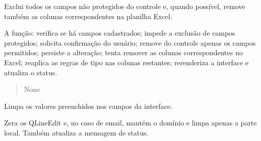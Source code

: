 \documentclass[letterpaper,10pt,english]{sphinxmanual}
\begin{document}
\begin{fulllineitems}
\begin{fulllineitems}
\begin{quote}
\begin{description}
\end{description}\end{quote}

\end{fulllineitems}


\begin{fulllineitems}
\label{\detokenize{api/app:app.App.delete_all_fields}}
\pysigstartsignatures
\pysiglinewithargsret
{}
{}
{}
\pysigstopsignatures
\sphinxAtStartPar
Exclui todos os campos não protegidos do controle e, quando possível,
remove também as colunas correspondentes na planilha Excel.

\sphinxAtStartPar
A função:
\sphinxhyphen{} verifica se há campos cadastrados;
\sphinxhyphen{} impede a exclusão de campos protegidos;
\sphinxhyphen{} solicita confirmação do usuário;
\sphinxhyphen{} remove do controle apenas os campos permitidos;
\sphinxhyphen{} persiste a alteração;
\sphinxhyphen{} tenta remover as colunas correspondentes no Excel;
\sphinxhyphen{} reaplica as regras de tipo nas colunas restantes;
\sphinxhyphen{} re\sphinxhyphen{}renderiza a interface e atualiza o status.
\begin{quote}\begin{description}
\sphinxAtStartPar
{}

\sphinxAtStartPar
None

\end{description}\end{quote}

\end{fulllineitems}


\begin{fulllineitems}
\label{\detokenize{api/app:app.App.clear_fields}}
\pysigstartsignatures
\pysiglinewithargsret
{}
{}
{}
\pysigstopsignatures
\sphinxAtStartPar
Limpa os valores preenchidos nos campos da interface.

\sphinxAtStartPar
Zera os QLineEdit e, no caso de e\sphinxhyphen{}mail, mantém o domínio e limpa apenas a
parte local. Também atualiza a mensagem de status.
\begin{quote}\begin{description}
\sphinxAtStartPar
{}


\end{description}
\end{quote}
\end{fulllineitems}
\end{fulllineitems}
\end{document}
